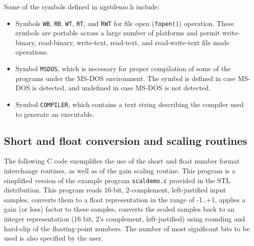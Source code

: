 Some of the symbols defined in ugstdemo.h include:
\begin{itemize}
 \item  Symbols {\tt WB}, {\tt RB}, {\tt WT}, {\tt RT}, and {\tt RWT}
        for file open ({\tt fopen()}) operation. These symbols are
        portable across a large number of platforms and permit
        write-binary, read-binary, write-text, read-text, and
        read-write-text file mode operations.
 \item  Symbol {\tt MSDOS}, which is necessary for proper compilation
        of some of the programs under the MS-DOS environment. The
        symbol is defined in case MS-DOS is detected, and undefined in
        case MS-DOS is not detected.
 \item  Symbol {\tt COMPILER}, which contains a text string describing
        the compiler used to generate an executable.
\end{itemize}


\subsection{Short and float conversion and scaling routines}

The following C code exemplifies the use of the short and float
number  format interchange routines, as well as of the gain scaling
routine. This  program is a simplified version of the example program
{\tt scaldemo.c} provided in the STL distribution. This program reads
16-bit, 2-complement, left-justified input samples, converts them to
a float representation in the range of -1..+1, applies a gain (or
loss) factor to these samples, converts the scaled samples back to an
integer representation (16 bit, 2's complement, left-justified) using
rounding and hard-clip of the floating-point numbers. The number of
most significant bits to be used is also specified by the user.

